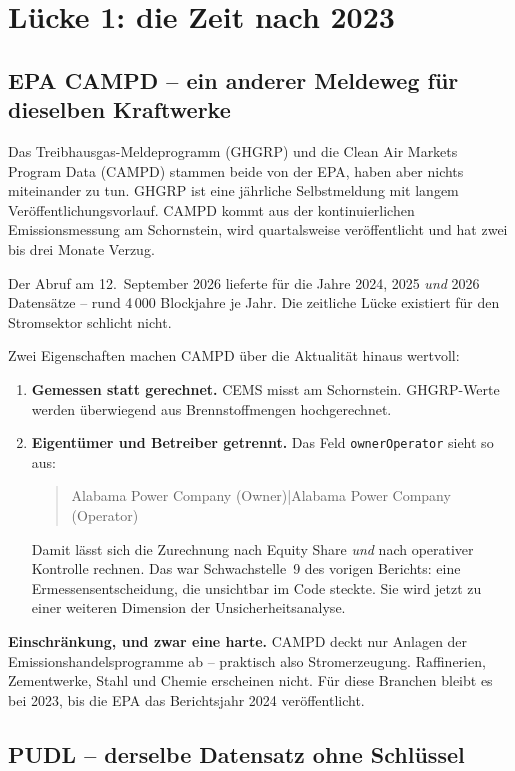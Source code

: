 \documentclass[11pt,a4paper]{article}
\newcommand{\befund}[1]{%
  \par\vspace{2pt}\noindent\colorbox{softgrey}{%
  \begin{minipage}{\dimexpr\linewidth-2\fboxsep}\small\vspace{3pt}#1\vspace{3pt}\end{minipage}}\par\vspace{4pt}}
\begin{document}
\section{Lücke 1: die Zeit nach 2023}

\subsection{EPA CAMPD -- ein anderer Meldeweg für dieselben Kraftwerke}

Das Treibhausgas-Meldeprogramm (GHGRP) und die Clean Air Markets Program Data (CAMPD) stammen beide von der EPA, haben aber nichts miteinander zu tun. GHGRP ist eine jährliche Selbstmeldung mit langem Veröffentlichungsvorlauf. CAMPD kommt aus der kontinuierlichen Emissionsmessung am Schornstein, wird quartalsweise veröffentlicht und hat zwei bis drei Monate Verzug.

Der Abruf am 12.~September 2026 lieferte für die Jahre 2024, 2025 \emph{und} 2026 Datensätze -- rund 4\,000 Blockjahre je Jahr. Die zeitliche Lücke existiert für den Stromsektor schlicht nicht.

Zwei Eigenschaften machen CAMPD über die Aktualität hinaus wertvoll:

\begin{enumerate}
\item \textbf{Gemessen statt gerechnet.} CEMS misst am Schornstein. GHGRP-Werte werden überwiegend aus Brennstoffmengen hochgerechnet.
\item \textbf{Eigentümer und Betreiber getrennt.} Das Feld \texttt{ownerOperator} sieht so aus:
\begin{quote}\footnotesize\ttfamily
Alabama Power Company (Owner)|Alabama Power Company (Operator)
\end{quote}
Damit lässt sich die Zurechnung nach Equity Share \emph{und} nach operativer Kontrolle rechnen. Das war Schwachstelle~9 des vorigen Berichts: eine Ermessensentscheidung, die unsichtbar im Code steckte. Sie wird jetzt zu einer weiteren Dimension der Unsicherheitsanalyse.
\end{enumerate}

\befund{\textbf{Einschränkung, und zwar eine harte.} CAMPD deckt nur Anlagen der Emissionshandelsprogramme ab -- praktisch also Stromerzeugung. Raffinerien, Zementwerke, Stahl und Chemie erscheinen nicht. Für diese Branchen bleibt es bei 2023, bis die EPA das Berichtsjahr 2024 veröffentlicht.}

\subsection{PUDL -- derselbe Datensatz ohne Schlüssel}
\end{document}
